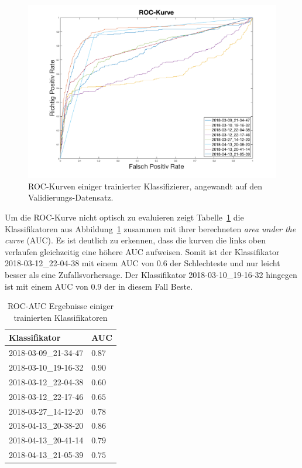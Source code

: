 \begin{figure}[htb!]
	\begin{center}
		\includegraphics[width=\textwidth]{./pics/evaluation/roc_analysis.png}
		\caption{ROC-Kurven einiger trainierter Klassifizierer, angewandt auf den Validierungs-Datensatz.}
		\label{fig:roc}
    \end{center}
\end{figure}

Um die ROC-Kurve nicht optisch zu evaluieren zeigt Tabelle~\ref{tab:auc} die Klassifikatoren aus Abbildung~\ref{fig:roc} zusammen mit ihrer berechneten \textit{area under the curve} (AUC). Es ist deutlich zu erkennen, dass die kurven die links oben verlaufen gleichzeitig eine höhere AUC aufweisen. Somit ist der Klassifikator 2018-03-12\_22-04-38 mit einem AUC von $0.6$ der Schlechteste und nur leicht besser als eine Zufallsvorhersage. Der Klassifikator 2018-03-10\_19-16-32 hingegen ist mit einem AUC von 0.9 der in diesem Fall Beste. 

\begin{table}[htb!]
\begin{center}
\begin{tabular}{ll}
	\toprule
 	Klassifikator  & AUC\\
	\midrule
  	2018-03-09\_21-34-47 &   $0.87$\\
    2018-03-10\_19-16-32 &   $0.90$\\
    2018-03-12\_22-04-38 &   $0.60$\\
    2018-03-12\_22-17-46 &   $0.65$\\
    2018-03-27\_14-12-20 &   $0.78$\\
    2018-04-13\_20-38-20 &   $0.86$\\
    2018-04-13\_20-41-14 &   $0.79$\\
    2018-04-13\_21-05-39 &   $0.75$\\
 \bottomrule
 \end{tabular}
 \end{center}
  \caption{ROC-AUC Ergebnisse einiger trainierten Klassifikatoren}
 \label{tab:auc}
 \end{table}
 
